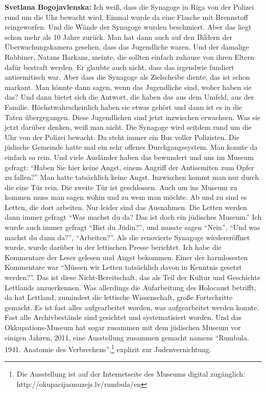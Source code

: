 \textbf{Svetlana Bogojavlenska:} Ich weiß, dass die Synagoge in Riga von der Polizei rund um die Uhr bewacht wird. Einmal wurde da eine Flasche mit Brennstoff reingeworfen. Und die Wände der Synagoge wurden beschmiert. Aber das liegt schon mehr als 10 Jahre zurück. Man hat dann auch auf den Bildern der Überwachungskamera gesehen, dass das Jugendliche waren. Und der damalige Rabbiner, Natans Barkans, meinte, die sollten einfach zuhause von ihren Eltern dafür bestraft werden. Er glaubte auch nicht, dass das irgendwie fundiert antisemitisch war. Aber dass die Synagoge als Zielscheibe diente, das ist schon markant. Man könnte dann sagen, wenn das Jugendliche sind, woher haben sie das? Und dann bietet sich die Antwort, die haben das aus dem Umfeld, aus der Familie. Höchstwahrscheinlich haben sie etwas gehört und dann ist es in die Taten übergegangen. Diese Jugendlichen sind jetzt inzwischen erwachsen. Was sie jetzt darüber denken, weiß man nicht. Die Synagoge wird seitdem rund um die Uhr von der Polizei bewacht. Da steht immer ein Bus voller Polizisten. Die jüdische Gemeinde hatte mal ein sehr offenes Durchgangssystem. Man konnte da einfach so rein. Und viele Ausländer haben das bewundert und uns im Museum gefragt: "`Haben Sie hier keine Angst, einem Angriff der Antisemiten zum Opfer zu fallen?"' Man hatte tatsächlich keine Angst. Inzwischen kommt man nur durch die eine Tür rein. Die zweite Tür ist geschlossen. Auch um ins Museum zu kommen muss man sagen wohin und zu wem man möchte.
Ab und zu sind es Letten, die dort arbeiten. Nur leider sind das Ausnahmen. Die Letten werden dann immer gefragt "`Was machst du da? Das ist doch ein jüdisches Museum."' Ich wurde auch immer gefragt "`Bist du Jüdin?"', und musste sagen "`Nein"', "`Und was machst du dann da?"', "`Arbeiten?"'. Als die renovierte Synagoge wiedereröffnet wurde, wurde darüber in der lettischen Presse berichtet. Ich habe die Kommentare der Leser gelesen und Angst bekommen. Einer der harmlosesten Kommentare war "`Müssen wir Letten tatsächlich davon in Kenntnis gesetzt werden?"'. Das ist diese Nicht-Bereitschaft, das als Teil der Kultur und Geschichte Lettlands anzuerkennen.
Was allerdings die Aufarbeitung des Holocaust betrifft, da hat Lettland, zumindest die lettische Wissenschaft, große Fortschritte gemacht. Es ist fast alles aufgearbeitet worden, was aufgearbeitet werden konnte. Fast alle Archivbestände sind gesichtet und systematisiert worden. Und das Okkupations-Museum hat sogar zusammen mit dem jüdischen Museum vor einigen Jahren, 2011, eine Ausstellung zusammen gemacht namens "`Rumbula. 1941. Anatomie des Verbrechens"',\footnote{Die Ausstellung ist auf der Internetseite des Museums digital zugänglich: http://okupacijasmuzejs.lv/rumbula/en} explizit zur Judenvernichtung.

